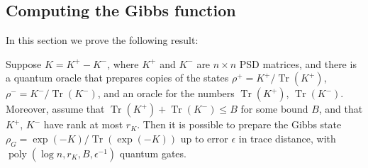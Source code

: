\documentclass[a4paper,UKenglish,cleveref, autoref]{lipics-v2019}
\theoremstyle{remark}
\numberwithin{equation}{section}
\numberwithin{oracle}{section}
\numberwithin{remark}{section}
\DeclareMathOperator{\poly}{poly}
\DeclareMathOperator{\tr}{Tr}
\begin{document}
\subsection{Computing the Gibbs function}\label{append:Gibbs-function}
In this section we prove the following result:
\begin{theorem}\label{thm:gibbs}
Suppose $K = K^+ - K^-$, where $K^+$ and $K^-$ are $n \times n$ PSD matrices, and there is a quantum oracle that prepares copies of the states $\rho^+=K^+ / \tr(K^+)$, $\rho^- = K^-/ \tr(K^-)$, and an oracle for the numbers $\tr(K^+)$, $\tr(K^-)$. Moreover, assume that $\tr(K^+) + \tr(K^-) \le B$ for some bound $B$, and that $K^+$, $K^-$ have rank at most $r_{K}$. Then it is possible to prepare the Gibbs state $\rho_G=\exp(-K)/\tr(\exp(-K))$ up to error $\epsilon$ in trace distance, with $\poly(\log n, r_{K}, B, \epsilon^{-1})$ quantum gates.
\end{theorem}
\end{document}
